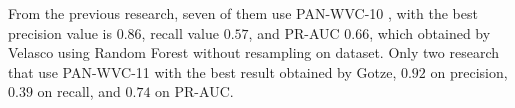 From the previous research, seven of them use PAN-WVC-10
\cite{adler2010detecting}
\cite{adler2011wikipedia}
\cite{gotze2014advanced}
\cite{harpalani2011language}
\cite{mola2012wikipedia}
\cite{wang2010got}
\cite{west2011multilingual},
with the best precision value is $0.86$, recall value $0.57$, and PR-AUC
$0.66$, which obtained by Velasco using Random Forest without resampling on
dataset.
Only two research that use PAN-WVC-11
\cite{gotze2014advanced}
\cite{west2011multilingual}
with the best result obtained by Gotze, $0.92$ on precision, $0.39$
on recall, and $0.74$ on PR-AUC.
